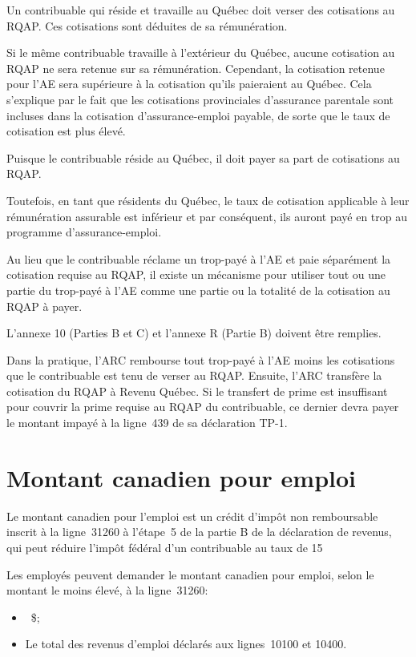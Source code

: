 Un contribuable qui réside et travaille au Québec doit verser des cotisations au RQAP. Ces cotisations sont déduites de sa rémunération. 

Si le même contribuable travaille à l'extérieur du Québec, aucune cotisation au RQAP ne sera retenue sur sa rémunération. Cependant, la cotisation retenue pour l'AE sera supérieure à la cotisation qu'ils paieraient au Québec. Cela s'explique par le fait que les cotisations provinciales d'assurance parentale sont incluses dans la cotisation d'assurance-emploi payable, de sorte que le taux de cotisation est plus élevé.

Puisque le contribuable réside au Québec, il doit payer sa part de cotisations au RQAP. 

Toutefois, en tant que résidents du Québec, le taux de cotisation applicable à leur rémunération assurable est inférieur et par conséquent, ils auront payé en trop au programme d'assurance-emploi.

Au lieu que le contribuable réclame un trop-payé à l'AE et paie séparément la cotisation requise au RQAP, il existe un mécanisme pour utiliser tout ou une partie du trop-payé à l'AE comme une partie ou la totalité de la cotisation au RQAP à payer.

L'annexe 10 (Parties B et C) et l'annexe R (Partie B) doivent être remplies.

Dans la pratique, l'ARC rembourse tout trop-payé à l'AE moins les cotisations que le contribuable est tenu de verser au RQAP. Ensuite, l'ARC transfère la cotisation du RQAP à Revenu Québec. Si le transfert de prime est insuffisant pour couvrir la prime requise au RQAP du contribuable, ce dernier devra payer le montant impayé à la ligne~439 de sa déclaration TP-1.



\section{Montant canadien pour emploi}
\begin{intro}
	Le montant canadien pour l'emploi est un crédit d'impôt non remboursable inscrit à la ligne~31260 à l'étape~5 de la partie B de la déclaration de revenus, qui peut réduire l'impôt fédéral d'un contribuable au taux de 15 %
\end{intro}

Les employés peuvent demander le montant canadien pour emploi, selon le montant le moins élevé, à la ligne~31260:

\begin{itemize}
	\item {}~\$;
	\item Le total des revenus d'emploi déclarés aux lignes~10100 et 10400.
\end{itemize}

